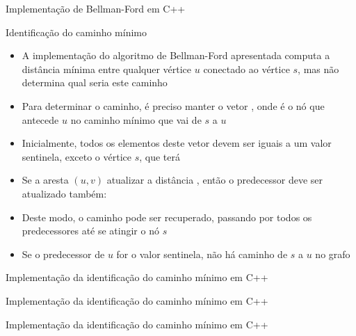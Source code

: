 \begin{frame}[fragile]{Implementação de Bellman-Ford em C++}
\end{frame}


\begin{frame}[fragile]{Identificação do caminho mínimo}

    \begin{itemize}
        \item A implementação do algoritmo de Bellman-Ford apresentada computa a distância
            mínima entre qualquer vértice $u$ conectado ao vértice $s$, mas não determina
            qual seria este caminho

        \item Para determinar o caminho, é preciso manter o vetor , onde
             é o nó que antecede $u$ no caminho mínimo que vai de $s$ a 
            $u$

        \item Inicialmente, todos os elementos deste vetor devem ser iguais a um valor sentinela,
            exceto o vértice $s$, que terá 

        \item Se a aresta $(u, v)$ atualizar a distância , então o 
            predecessor deve ser atualizado também: 

        \item Deste modo, o caminho pode ser recuperado, passando por todos os predecessores até
            se atingir o nó $s$

        \item Se o predecessor de $u$ for o valor sentinela, não há caminho de $s$ a $u$ no
            grafo
    \end{itemize}

\end{frame}

\begin{frame}[fragile]{Implementação da identificação do caminho mínimo em C++}
\end{frame}

\begin{frame}[fragile]{Implementação da identificação do caminho mínimo em C++}
\end{frame}

\begin{frame}[fragile]{Implementação da identificação do caminho mínimo em C++}
\end{frame}


